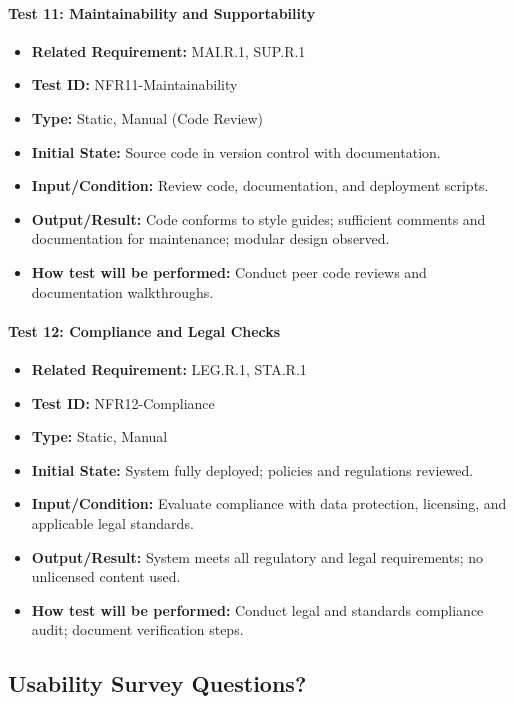 \documentclass[12pt, titlepage]{article}
\begin{document}
\paragraph{Test 11: Maintainability and Supportability}
\begin{itemize}
    \item \textbf{Related Requirement:} MAI.R.1, SUP.R.1
    \item \textbf{Test ID:} NFR11-Maintainability
    \item \textbf{Type:} Static, Manual (Code Review)
    \item \textbf{Initial State:} Source code in version control with documentation.
    \item \textbf{Input/Condition:} Review code, documentation, and deployment scripts.
    \item \textbf{Output/Result:} Code conforms to style guides; sufficient comments and documentation for maintenance; modular design observed.
    \item \textbf{How test will be performed:} Conduct peer code reviews and documentation walkthroughs.
\end{itemize}

\paragraph{Test 12: Compliance and Legal Checks}
\begin{itemize}
    \item \textbf{Related Requirement:} LEG.R.1, STA.R.1
    \item \textbf{Test ID:} NFR12-Compliance
    \item \textbf{Type:} Static, Manual
    \item \textbf{Initial State:} System fully deployed; policies and regulations reviewed.
    \item \textbf{Input/Condition:} Evaluate compliance with data protection, licensing, and applicable legal standards.
    \item \textbf{Output/Result:} System meets all regulatory and legal requirements; no unlicensed content used.
    \item \textbf{How test will be performed:} Conduct legal and standards compliance audit; document verification steps.
\end{itemize}


\subsection{Usability Survey Questions?}
\end{document}

